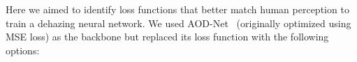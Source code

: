 \documentclass[10pt,twocolumn,letterpaper]{article}
\begin{document}
Here we aimed to identify loss functions that better match human perception to train a dehazing neural network. We used AOD-Net~\cite{li2017aod} (originally optimized using MSE loss) as the backbone but replaced its loss function with the following options: 






\end{document}
